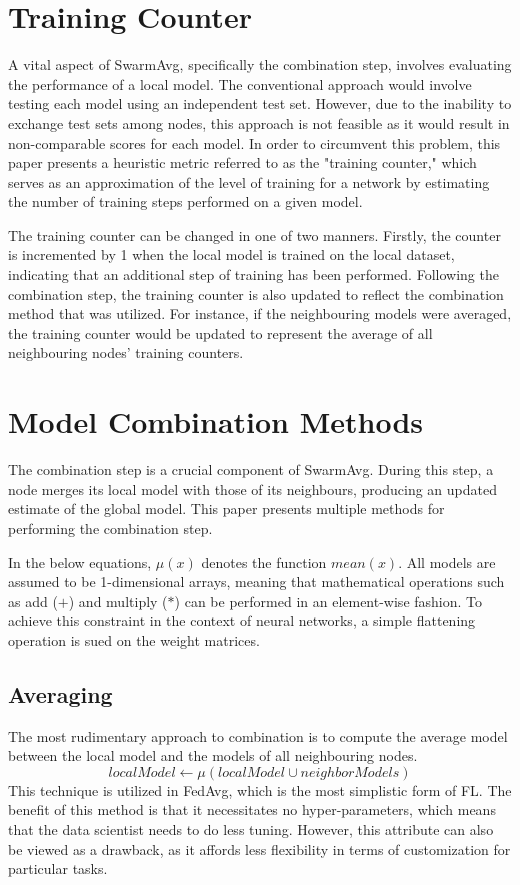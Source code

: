 \section{Training Counter}
A vital aspect of SwarmAvg, specifically the combination step, involves evaluating the performance of a local model. The conventional approach would involve testing each model using an independent test set. However, due to the inability to exchange test sets among nodes, this approach is not feasible as it would result in non-comparable scores for each model. In order to circumvent this problem, this paper presents a heuristic metric referred to as the "training counter," which serves as an approximation of the level of training for a network by estimating the number of training steps performed on a given model.

The training counter can be changed in one of two manners. Firstly, the counter is incremented by 1 when the local model is trained on the local dataset, indicating that an additional step of training has been performed. Following the combination step, the training counter is also updated to reflect the combination method that was utilized. For instance, if the neighbouring models were averaged, the training counter would be updated to represent the average of all neighbouring nodes' training counters.

\section{Model Combination Methods} \label{mcm}
The combination step is a crucial component of SwarmAvg. During this step, a node merges its local model with those of its neighbours, producing an updated estimate of the global model. This paper presents multiple methods for performing the combination step.

In the below equations, $\mu(x)$ denotes the function $mean(x)$. All models are assumed to be 1-dimensional arrays, meaning that mathematical operations such as add ($+$) and multiply ($*$) can be performed in an element-wise fashion. To achieve this constraint in the context of neural networks, a simple flattening operation is sued on the weight matrices.

\subsection{Averaging}
The most rudimentary approach to combination is to compute the average model between the local model and the models of all neighbouring nodes.
\[ localModel \gets \mu(localModel \cup neighborModels) \]
This technique is utilized in FedAvg, which is the most simplistic form of FL. The benefit of this method is that it necessitates no hyper-parameters, which means that the data scientist needs to do less tuning. However, this attribute can also be viewed as a drawback, as it affords less flexibility in terms of customization for particular tasks.

